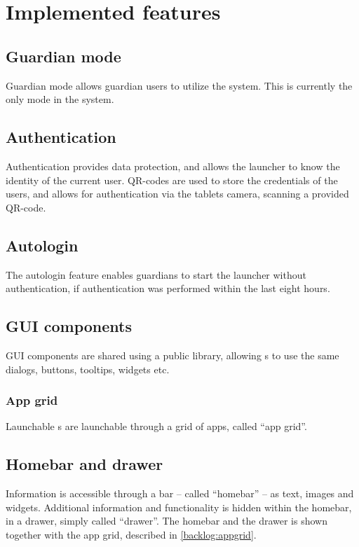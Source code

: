 \section{Implemented features}
\label{backlog_implemented}

\subsection{Guardian mode}
\label{backlog:guardian_mode}
Guardian mode allows guardian users to utilize the \giraf[] system. 
This is currently the only mode in the system.

%
\subsection{Authentication}
\label{backlog:authentication}
Authentication provides data protection, and allows the launcher to know the identity of the current user.
QR-codes are used to store the credentials of the users, and allows for authentication via the tablets camera, scanning a provided QR-code.

\subsection{Autologin}
\label{backlog:autologin}
The autologin feature enables guardians to start the launcher without authentication, if authentication was performed within the last eight hours.

%
\subsection{GUI components}
\label{backlog:GUI_components}
GUI components are shared using a public library, allowing \girafapp[]s to use the same dialogs, buttons, tooltips, widgets etc.

\subsubsection{App grid}
\label{backlog:appgrid}
Launchable \girafapp[]s are launchable through a grid of apps, called "`app grid"'.

%
\subsection{Homebar and drawer}
\label{backlog:homebar_drawer}
Information is accessible through a bar -- called "`homebar"' -- as text, images and widgets.
Additional information and functionality is hidden within the homebar, in a drawer, simply called "`drawer"'. 
The homebar and the drawer is shown together with the app grid, described in \autoref{backlog:appgrid}.


